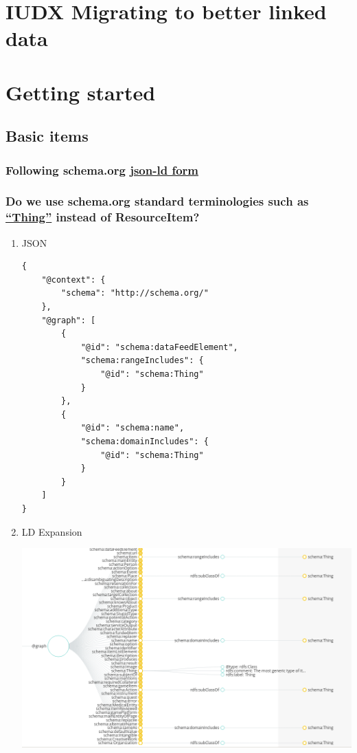 \documentclass[11pt]{article}
\author{rraks}
\date{\today}
\title{}
\begin{document}
\tableofcontents

\section{IUDX Migrating to better linked data}
\label{sec:org8cd3bdb}


\section{Getting started}
\label{sec:org4b8a498}
\subsection{Basic items}
\label{sec:org3b26ea5}
\subsubsection{Following schema.org \href{https://schema.org/}{json-ld form}}
\label{sec:org017acbf}



\subsubsection{Do we use schema.org standard terminologies such as \href{https://schema.org/Thing.jsonld}{``Thing''} instead of ResourceItem?}
\label{sec:org4d130c9}
\begin{enumerate}
\item JSON
\label{sec:orgbe4459f}
\begin{verbatim}
{
    "@context": {
        "schema": "http://schema.org/"
    },
    "@graph": [
        {
            "@id": "schema:dataFeedElement",
            "schema:rangeIncludes": {
                "@id": "schema:Thing"
            }
        },
        {
            "@id": "schema:name",
            "schema:domainIncludes": {
                "@id": "schema:Thing"
            }
        }
    ]
}
\end{verbatim}
\item LD Expansion
\label{sec:org1c189cb}
\begin{center}
\includegraphics[width=.9\linewidth]{./graph.png}
\end{center}
\end{enumerate}
\end{document}
